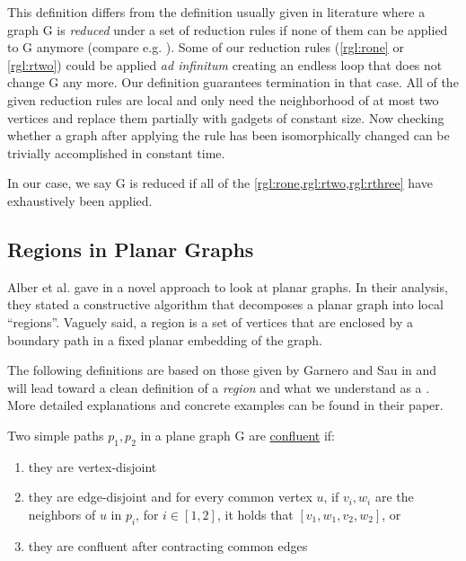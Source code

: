 This definition differs from the definition usually given in literature where a graph G is \textit{reduced} under a set of reduction rules if none of them can be applied to G anymore (compare e.g. \cite{Fomin2019}). Some of our reduction rules (\cref{rgl:rone} or \cref{rgl:rtwo}) could be applied \textit{ad infinitum} creating an endless loop that does not change G any more. Our definition guarantees termination in that case. All of the given reduction rules are local and only need the neighborhood of at most two vertices and replace them partially with gadgets of constant size. Now checking whether a graph after applying the rule has been isomorphically changed can be trivially accomplished in constant time.

In our case, we say G is reduced if all of the \cref{rgl:rone,rgl:rtwo,rgl:rthree} have exhaustively been applied.

\subsection{Regions in Planar Graphs}

Alber et al. gave in \cite{Alber2004} a novel approach to look at planar graphs. In their analysis, they stated a constructive algorithm that decomposes a planar graph into local ``regions''. Vaguely said, a region is a set of vertices that are enclosed by a boundary path in a fixed planar embedding of the graph.

The following definitions are based on those given by Garnero and Sau in \cite[Revision 2014]{Garnero2018} and will lead toward a clean definition of a \textit{region} and what we understand as a \dreg. More detailed explanations and concrete examples can be found in their paper.

\begin{definition}
    Two simple paths $p_1, p_2$ in a plane graph G are \underline{confluent} if:
    
    \begin{enumerate}
        \item they are vertex-disjoint
        \item they are edge-disjoint and for every common vertex $u$, if $v_i, w_i$ are the neighbors of $u$ in $p_i$, for $i \in [1,2]$, it holds that $[v_1, w_1, v_2, w_2]$, or
        \item they are confluent after contracting common edges
    \end{enumerate}
\end{definition}


